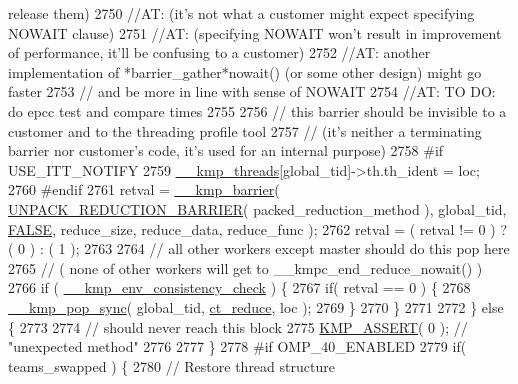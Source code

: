 \begin{DoxyCode}
{{       release them)}
2750         \textcolor{comment}{//AT:     (it's not what a customer might expect specifying NOWAIT clause)}
2751         \textcolor{comment}{//AT:     (specifying NOWAIT won't result in improvement of performance, it'll be confusing to a
       customer)}
2752         \textcolor{comment}{//AT: another implementation of *barrier\_gather*nowait() (or some other design) might go faster}
2753         \textcolor{comment}{//        and be more in line with sense of NOWAIT}
2754         \textcolor{comment}{//AT: TO DO: do epcc test and compare times}
2755 
2756         \textcolor{comment}{// this barrier should be invisible to a customer and to the threading profile tool}
2757         \textcolor{comment}{//              (it's neither a terminating barrier nor customer's code, it's used for an internal
       purpose)}
2758 \textcolor{preprocessor}{#if USE\_ITT\_NOTIFY}
2759 \textcolor{preprocessor}{}        \hyperlink{kmp_8h_a8ba907eb5a2568ff55a49a1504cd3624}{\_\_kmp\_threads}[global\_tid]->th.th\_ident = loc;
2760 \textcolor{preprocessor}{#endif}
2761 \textcolor{preprocessor}{}        retval = \hyperlink{kmp_8h_a2db240b744f3af1eb8413df50dbe6118}{\_\_kmp\_barrier}( \hyperlink{kmp_8h_a1ccb73b52bdd6146311ed40707c69b9a}{UNPACK\_REDUCTION\_BARRIER}( 
      packed\_reduction\_method ), global\_tid, \hyperlink{kmp_8h_aa93f0eb578d23995850d61f7d61c55c1}{FALSE}, reduce\_size, reduce\_data, reduce\_func );
2762         retval = ( retval != 0 ) ? ( 0 ) : ( 1 );
2763 
2764         \textcolor{comment}{// all other workers except master should do this pop here}
2765         \textcolor{comment}{//     ( none of other workers will get to \_\_kmpc\_end\_reduce\_nowait() )}
2766         \textcolor{keywordflow}{if} ( \hyperlink{kmp_8h_ab4062d4f566c901230e51490a8819ba0}{\_\_kmp\_env\_consistency\_check} ) \{
2767             \textcolor{keywordflow}{if}( retval == 0 ) \{
2768                 \hyperlink{kmp__error_8c_ab716717d70650eeeb205b057232d7c1c}{\_\_kmp\_pop\_sync}( global\_tid, \hyperlink{kmp_8h_a1582e7ddc609220a660d10244ef3e315a69ad53348e0bb90d6e3adee6345553ca}{ct\_reduce}, loc );
2769             \}
2770         \}
2771 
2772     \} \textcolor{keywordflow}{else} \{
2773 
2774         \textcolor{comment}{// should never reach this block}
2775         \hyperlink{kmp__debug_8h_a5323a368e8ba273b17c46906dd9ec78c}{KMP\_ASSERT}( 0 ); \textcolor{comment}{// "unexpected method"}
2776 
2777     \}
2778 \textcolor{preprocessor}{#if OMP\_40\_ENABLED}
2779 \textcolor{preprocessor}{}    \textcolor{keywordflow}{if}( teams\_swapped ) \{
2780         \textcolor{comment}{// Restore thread structure}
}
\end{DoxyCode}
